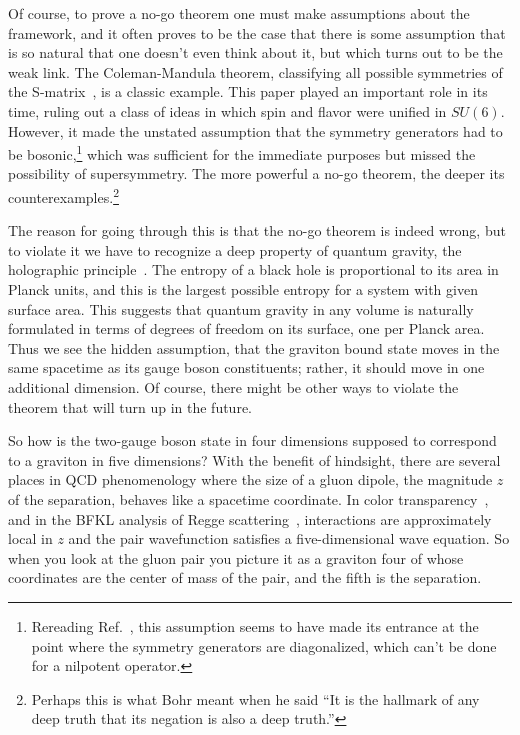 \documentclass[12pt]{article}
\begin{document}
Of course, to prove a no-go theorem one must make assumptions about the framework, and it often proves to be the case that there is some assumption that is so natural that one doesn't even think about it, but which turns out to be the weak link.  The Coleman-Mandula theorem, classifying all possible symmetries of the S-matrix~\cite{Coleman:1967ad}, is a classic example.  This paper played an important role in its time, ruling out a class of ideas in which spin and flavor were unified in $SU(6)$.  However, it made the unstated assumption that the symmetry generators had to be bosonic,\footnote{Rereading Ref.~\cite{Coleman:1967ad}, this assumption seems to have made its entrance at the point where the symmetry generators are diagonalized, which can't be done for a nilpotent operator.} which was sufficient for the immediate purposes but missed the possibility of supersymmetry.  The more powerful a no-go theorem, the deeper its counterexamples.\footnote{Perhaps this is what Bohr meant when he said ``It is the hallmark of any deep truth that its negation is also a deep truth.''}

The reason for going through this is that the no-go theorem is indeed wrong, but to violate it we have to recognize a deep property of quantum gravity, the holographic principle~\cite{'tHooft:1993gx,Susskind:1994vu}.  The entropy of a black hole is proportional to its area in Planck units, and this is the largest possible entropy for a system with given surface area.  This suggests that quantum gravity in any volume is naturally formulated in terms of degrees of freedom on its surface, one per Planck area.  Thus we see the hidden assumption, that the graviton bound state moves in the same spacetime as its gauge boson constituents; rather, it should move in one additional dimension.  Of course, there might be other ways to violate the theorem that will turn up in the future.

So how is the two-gauge boson state in four dimensions supposed to correspond to a graviton in five dimensions?  With the benefit of hindsight, there are several places in QCD phenomenology where the size of a gluon dipole, the magnitude $z$ of the separation, behaves like a spacetime coordinate.  In color transparency~\cite{Bertsch:1981py}, and in the BFKL analysis of Regge scattering~\cite{Lipatov:1985uk}, interactions are approximately local in $z$ and the pair wavefunction satisfies a five-dimensional wave equation.  So when you look at the gluon pair you picture it as a graviton four of whose coordinates are the center of mass of the pair, and the fifth is the separation.
\end{document}

